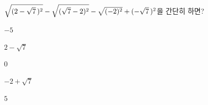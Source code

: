 $\sqrt{(2-\sqrt{7}\mkern3mu )^2}-\sqrt{(\sqrt{7}-2)^2}-\sqrt{(-2)^2}+(-\sqrt{7}\mkern3mu )^2$을 간단히 하면?
\begin{choices32}{\rule[-3ex]{0pt}{8ex}$-5$}{\rule[-3ex]{0pt}{8ex}$2-\sqrt{7}$}{\rule[-3ex]{0pt}{8ex}$0$}{\rule[-3ex]{0pt}{8ex}$-2+\sqrt{7}$}{\rule[-3ex]{0pt}{8ex}$5$}\end{choices32}
